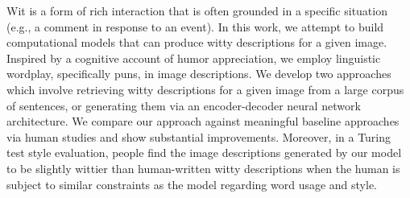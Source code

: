 Wit is a form of rich interaction that is often grounded in a specific situation (e.g., a comment in response to an event). In this work, we attempt to build computational models that can produce witty descriptions for a given image. Inspired by a cognitive account of humor appreciation, we employ linguistic wordplay, specifically puns, in image descriptions. We develop two approaches which involve retrieving witty descriptions for a given image from a large corpus of sentences, or generating them via an encoder-decoder neural network architecture. We compare our approach against meaningful baseline approaches via human studies and show substantial improvements. Moreover, in a Turing test style evaluation, people find the image descriptions generated by our model to be slightly wittier than human-written witty descriptions when the human is subject to similar constraints as the model regarding word usage and style.
